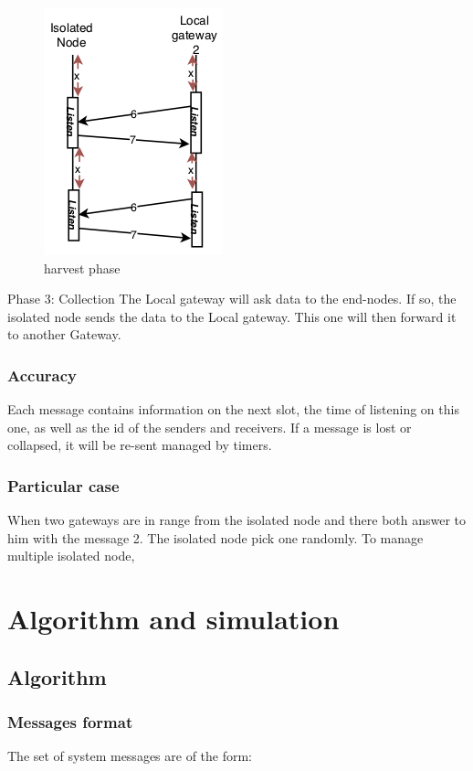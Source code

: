 \documentclass[conference]{IEEEtran}
\begin{document}
\begin{figure}[htbp]
\centerline{\includegraphics{harvest.png}}
\caption{harvest phase}
\label{fig3}
\end{figure}
Phase 3: Collection
The Local gateway will ask data to the end-nodes. If so, the isolated node sends the data to the Local gateway. This one will then forward it to another Gateway.
\newpage
\subsubsection{Accuracy}
Each message contains information on the next slot, the time of listening on this one, as well as the id of the senders and receivers. If a message is lost or collapsed, it will be re-sent managed by timers.

\subsubsection{Particular case}
When two gateways are in range from the isolated node and there both answer to him with the message 2. The isolated node pick one randomly.
To manage multiple isolated node, 
\section{Algorithm and simulation}
\subsection{Algorithm}

\subsubsection{Messages format}

The set of system messages are of the form:
\end{document}
